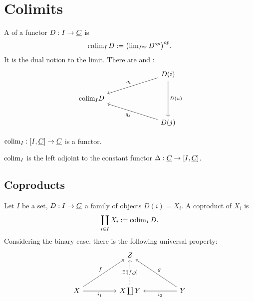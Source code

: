 \chapter{Colimits}

\begin{definition*}[Formal]
	A  of a functor \( D: I \to \underline{C} \) is
	\[
		\operatorname{colim}_I D := \bigl(\operatorname{lim}_{I^{op}} D^{op}\bigr)^{op}.
	\]
	It is the dual notion to the limit. There are  and :
	\[
		\begin{tikzcd}
			&&& {D(i)} \\
			{\text{colim}_I D} \\
			&&& {D(j)}
			\arrow["{q_i}"', from=1-4, to=2-1]
			\arrow["{D(u)}", from=1-4, to=3-4]
			\arrow["{q_j}", from=3-4, to=2-1]
		\end{tikzcd}
	\]
\end{definition*}

\begin{remarks*}
	\item \( \operatorname{colim}_I: [I, \underline{C}] \to \underline{C} \) is a functor.
	\item \( \operatorname{colim}_I \) is the left adjoint to the constant functor \( \Delta: \underline{C} \to [I, \underline{C}] \).
\end{remarks*}

\section{Coproducts}

\begin{definition*}
	Let \( I \) be a set, \( D: I \to \underline{C} \) a family of objects \( D(i) = X_i \). A coproduct of \( X_i \) is
	\[
		\coprod_{i \in I} X_i := \operatorname{colim}_I D.
	\]
	Considering the binary case, there is the following universal property:
	\[
		\begin{tikzcd}
			&& Z \\
			\\
			X && {X \coprod Y} && Y
			\arrow["f", from=3-1, to=1-3]
			\arrow["{i_1}"', from=3-1, to=3-3]
			\arrow["{\exists! [f, g]}"{description}, dashed, from=3-3, to=1-3]
			\arrow["g"', from=3-5, to=1-3]
			\arrow["{i_2}", from=3-5, to=3-3]
		\end{tikzcd}
	\]
\end{definition*}


